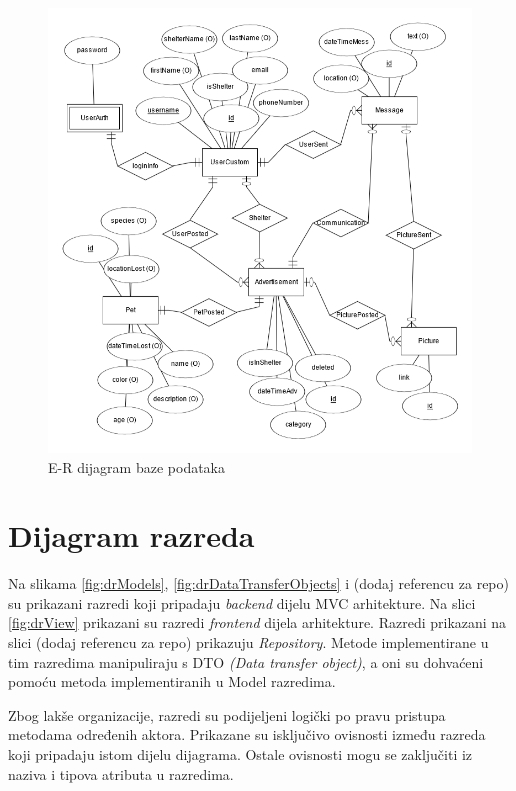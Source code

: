 				\begin{figure}[H]
					\includegraphics[scale=0.65]{dijagrami/dijagramBaze/ERmodel.PNG} %
					\centering
					\caption{E-R dijagram baze podataka}
					\label{fig:erDijagram}
				\end{figure}

			\eject
			
			
		\section{Dijagram razreda}
		
			Na slikama \ref{fig:drModels}, \ref{fig:drDataTransferObjects} i (dodaj referencu za repo) su prikazani razredi koji pripadaju \textit{backend} dijelu MVC arhitekture. Na slici \ref{fig:drView} prikazani su razredi \textit{frontend} dijela arhitekture. Razredi prikazani na slici (dodaj referencu za repo) prikazuju \textit{Repository}. Metode implementirane u tim razredima manipuliraju s DTO \textit{(Data transfer object)}, a oni su dohvaćeni pomoću metoda implementiranih u Model razredima.

			Zbog lakše organizacije, razredi su podijeljeni logički po pravu pristupa metodama određenih aktora. Prikazane su isključivo ovisnosti između razreda koji pripadaju istom dijelu dijagrama. Ostale ovisnosti mogu se zaključiti iz naziva i tipova atributa u razredima.

